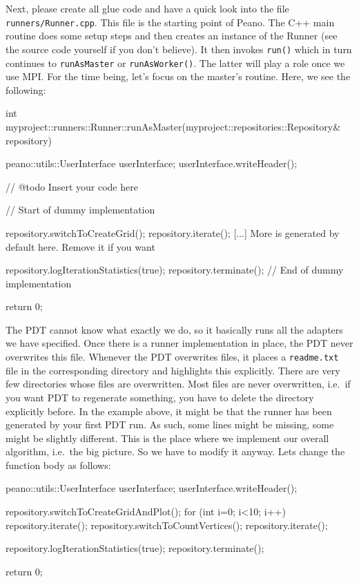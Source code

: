 \noindent
Next, please create all glue code and have a quick look into the file
\texttt{runners/Runner.cpp}.
This file is the starting point of Peano.
The C++ main routine does some setup steps and then creates an instance of the
Runner (see the source code yourself if you don't believe).
It then invokes \texttt{run()} which in turn continues to \texttt{runAsMaster}
or \texttt{runAsWorker()}.
The latter will play a role once we use MPI.
For the time being, let's focus on the master's routine.
Here, we see the following:

\begin{code}
int myproject::runners::Runner::runAsMaster(myproject::repositories::Repository& repository) {
  peano::utils::UserInterface userInterface;
  userInterface.writeHeader();

  // @todo Insert your code here
  
  // Start of dummy implementation
  
  repository.switchToCreateGrid(); repository.iterate();
  [...] More is generated by default here. Remove it if you want
 
  repository.logIterationStatistics(true);
  repository.terminate();
  // End of dummy implementation

  return 0;
}
\end{code}

\noindent
The PDT cannot know what exactly we do, so it basically runs all the adapters we
have specified.
Once there is a runner implementation in place, the PDT never overwrites this
file.
Whenever the PDT overwrites files, it places a \texttt{readme.txt} file in the
corresponding directory and highlights this explicitly.
There are very few directories whose files are overwritten.
Most files are never overwritten, i.e.~if you want PDT to regenerate something,
you have to delete the directory explicitly before.
In the example above, it might be that the runner has been generated by your
first PDT run.
As such, some lines might be missing, some might be slightly different.
This is the place where we implement our overall algorithm,
i.e.~the big picture.
So we have to modify it anyway.
Lets change the function body as follows:

\begin{code}
  peano::utils::UserInterface userInterface;
  userInterface.writeHeader();

  repository.switchToCreateGridAndPlot();
  for (int i=0; i<10; i++) repository.iterate();
  repository.switchToCountVertices(); repository.iterate();

  repository.logIterationStatistics(true);
  repository.terminate();

  return 0;
\end{code}

